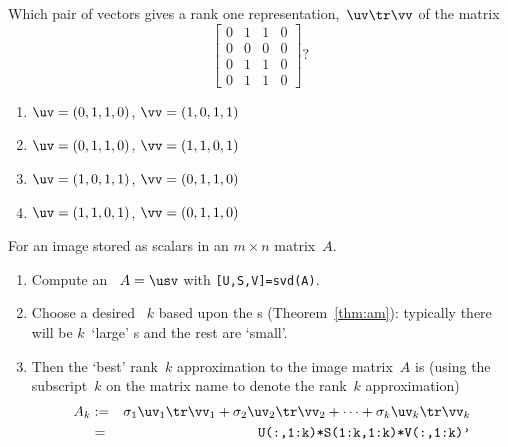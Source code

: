 \begin{example}
\begin{solution}
\begin{enumerate}
\end{enumerate}
\end{solution}
\end{example}




\begin{activity}
Which pair of vectors gives a rank one representation,~\(\uv\tr\vv\) of the matrix
\marginpar{}%
\begin{equation*}
\begin{bmatrix} 0&1&1&0 
\\0&0&0&0
\\0&1&1&0
\\0&1&1&0 \end{bmatrix}?
\end{equation*}
\begin{enumerate}
\item \(\uv=(0,1,1,0)\), \(\vv=(1,0,1,1)\)
\item \(\uv=(0,1,1,0)\), \(\vv=(1,1,0,1)\)
\item \(\uv=(1,0,1,1)\), \(\vv=(0,1,1,0)\)\actans
\item \(\uv=(1,1,0,1)\), \(\vv=(0,1,1,0)\)
\end{enumerate}
\end{activity}





\begin{procedure} \label{pro:ai} 
For an image stored as scalars in an \(m\times n\) matrix~\(A\).
\begin{enumerate}
\item Compute an \svd\ \(A=\usv\) with \verb|[U,S,V]=svd(A)|.
\item Choose a desired ~\(k\) based upon the s (Theorem~\ref{thm:am}): typically there will be \(k\)~`large' s and the rest are `small'.
\item Then the `best' rank~\(k\) approximation to the image matrix~\(A\) is (using the subscript~\(k\) on the matrix name to denote the rank~\(k\) approximation)
\begin{eqnarray*}
A_k&:=&\sigma_1\uv_1\tr\vv_1+\sigma_2\uv_2\tr\vv_2+\cdots+\sigma_k\uv_k\tr\vv_k
\\&=&\verb|U(:,1:k)*S(1:k,1:k)*V(:,1:k)'|
\end{eqnarray*}
\end{enumerate}
\end{procedure}






